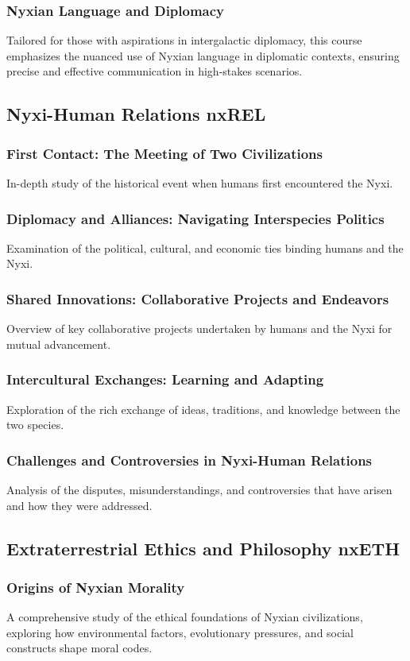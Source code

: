 \subsubsection{Nyxian Language and Diplomacy}
Tailored for those with aspirations in intergalactic diplomacy, this course emphasizes the nuanced use of Nyxian language in diplomatic contexts, ensuring precise and effective communication in high-stakes scenarios.


\subsection{Nyxi-Human Relations \hfill nxREL}
\subsubsection{First Contact: The Meeting of Two Civilizations}
In-depth study of the historical event when humans first encountered the Nyxi.
\subsubsection{Diplomacy and Alliances: Navigating Interspecies Politics}
Examination of the political, cultural, and economic ties binding humans and the Nyxi.
\subsubsection{Shared Innovations: Collaborative Projects and Endeavors}
Overview of key collaborative projects undertaken by humans and the Nyxi for mutual advancement.
\subsubsection{Intercultural Exchanges: Learning and Adapting}
Exploration of the rich exchange of ideas, traditions, and knowledge between the two species.
\subsubsection{Challenges and Controversies in Nyxi-Human Relations}
Analysis of the disputes, misunderstandings, and controversies that have arisen and how they were addressed.



\subsection{Extraterrestrial Ethics and Philosophy \hfill nxETH}
\subsubsection{Origins of Nyxian Morality}
A comprehensive study of the ethical foundations of Nyxian civilizations, exploring how environmental factors, evolutionary pressures, and social constructs shape moral codes.
